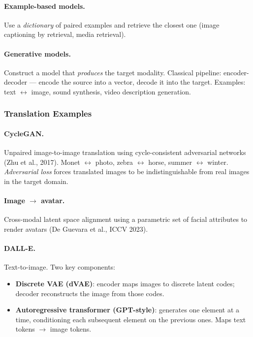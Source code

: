 \documentclass[11pt,a4paper]{article}
\theoremstyle{definition}
\theoremstyle{plain}
\theoremstyle{remark}
\begin{document}
\paragraph{Example-based models.} Use a \emph{dictionary} of paired examples and retrieve the closest one (image captioning by retrieval, media retrieval).

\paragraph{Generative models.} Construct a model that \emph{produces} the target modality. Classical pipeline: encoder-decoder --- encode the source into a vector, decode it into the target. Examples: text $\leftrightarrow$ image, sound synthesis, video description generation.

\subsubsection{Translation Examples}

\paragraph{CycleGAN.} Unpaired image-to-image translation using cycle-consistent adversarial networks (Zhu et al., 2017). Monet $\leftrightarrow$ photo, zebra $\leftrightarrow$ horse, summer $\leftrightarrow$ winter. \emph{Adversarial loss} forces translated images to be indistinguishable from real images in the target domain.

\paragraph{Image $\to$ avatar.} Cross-modal latent space alignment using a parametric set of facial attributes to render avatars (De Guevara et al., ICCV 2023).

\paragraph{DALL-E.} Text-to-image. Two key components:
\begin{itemize}
    \item \textbf{Discrete VAE (dVAE)}: encoder maps images to discrete latent codes; decoder reconstructs the image from those codes.
    \item \textbf{Autoregressive transformer (GPT-style)}: generates one element at a time, conditioning each subsequent element on the previous ones. Maps text tokens $\to$ image tokens.
\end{itemize}
\end{document}
